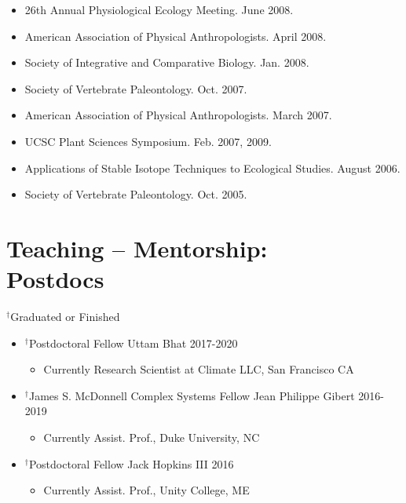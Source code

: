 \documentclass[margin,line,12pt]{res}
\begin{document}
\begin{resume}
\begin{itemize}
\item 26th Annual Physiological Ecology Meeting. June 2008.

\item American Association of Physical Anthropologists. April 2008.

\item Society of Integrative and Comparative Biology. Jan. 2008.

\item Society of Vertebrate Paleontology. Oct. 2007.

\item American Association of Physical Anthropologists. March 2007.

\item UCSC Plant Sciences Symposium. Feb. 2007, 2009.

\item Applications of Stable Isotope Techniques to Ecological Studies. August 2006.

\item Society of Vertebrate Paleontology. Oct. 2005.

\end{itemize}

\section{\sc Teaching -- Mentorship: \\ Postdocs}
{\footnotesize{${}^\dag$Graduated or Finished}}
\begin{itemize}
\item ${}^\dag$Postdoctoral Fellow Uttam Bhat \hfill 2017-2020
	\begin{itemize}  
		\item[] Currently Research Scientist at Climate LLC, San Francisco CA
	\end{itemize}
\item ${}^\dag$James S. McDonnell Complex Systems Fellow Jean Philippe Gibert \hfill 2016-2019
	\begin{itemize}  
		\item[] Currently Assist. Prof., Duke University, NC
	\end{itemize}  
\item ${}^\dag$Postdoctoral Fellow Jack Hopkins III \hfill 2016
	\begin{itemize}  
		\item[] Currently Assist. Prof., Unity College, ME
	\end{itemize}  
\end{itemize}


\end{resume}
\end{document}
